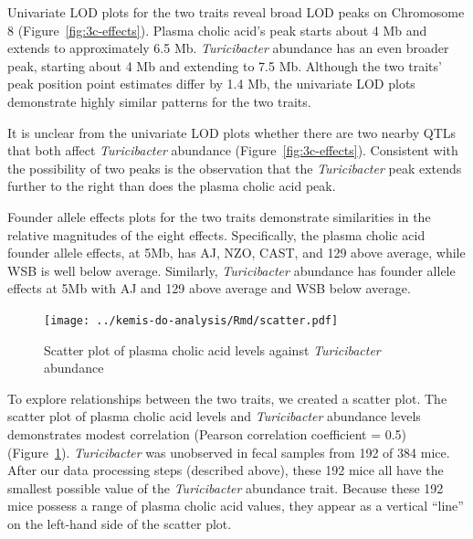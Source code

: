 \documentclass[oneside]{book}\usepackage[]{graphicx}\usepackage[]{color}
\begin{document}
Univariate LOD plots for the two traits reveal broad LOD peaks on Chromosome 8 (Figure~\ref{fig:3c-effects}). 
Plasma cholic acid's peak starts about 4 Mb and extends to approximately 6.5 Mb. 
\emph{Turicibacter} abundance has an even broader peak, starting about 4 Mb and extending to 7.5 Mb. 
Although the two traits' peak position point estimates differ by 1.4 Mb, the univariate LOD plots demonstrate highly similar patterns for the two traits.

It is unclear from the univariate LOD plots whether there are two 
nearby QTLs 
that both affect \emph{Turicibacter} abundance (Figure~\ref{fig:3c-effects}). 
Consistent with the possibility of two peaks is the observation that the
\emph{Turicibacter} peak extends further to the right than does the plasma 
cholic acid peak. 

Founder allele effects plots for the two traits demonstrate 
similarities in the relative magnitudes of the eight effects. 
Specifically, the plasma cholic acid founder allele effects, at 5Mb, 
has AJ, NZO, CAST, and 129 above average, while WSB is well below average. 
Similarly, \emph{Turicibacter} abundance has founder allele effects at 5Mb with AJ and 129 above average and WSB below average.


\begin{figure}
\texttt{[image: ../kemis-do-analysis/Rmd/scatter.pdf]}
\caption{Scatter plot of plasma cholic acid levels against \emph{Turicibacter} abundance}\label{fig:3c-scatter}
\end{figure}

To explore relationships between the two traits, we created a scatter plot. 
The scatter plot of plasma cholic acid levels and \emph{Turicibacter} abundance levels 
demonstrates modest correlation (Pearson correlation coefficient = 0.5) 
(Figure~\ref{fig:3c-scatter}). 
\emph{Turicibacter} was unobserved in fecal samples from 192 of 384 mice. After our data processing steps (described above), these 192 mice all have the smallest possible value of the \emph{Turicibacter} abundance trait. Because these 192 mice possess a range of plasma cholic acid values, they appear as a vertical ``line'' on the left-hand side of the scatter plot.
\end{document}
